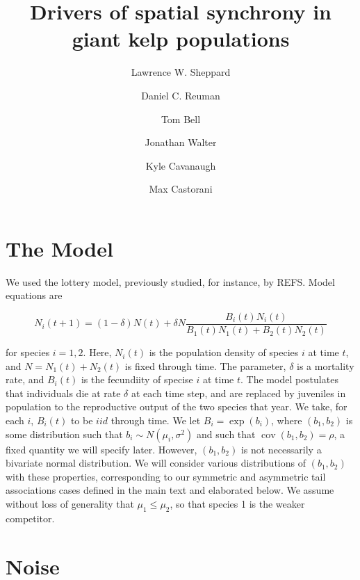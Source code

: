 \documentclass[letterpaper,11pt]{article}
\title{Drivers of spatial synchrony in giant kelp populations}
\date{}
\author{Lawrence W. Sheppard}
\author{Daniel C. Reuman}
\author{Tom Bell}
\author{Jonathan Walter}
\author{Kyle Cavanaugh}
\author{Max Castorani}
\DeclareMathOperator{\CovX}{cov}
\begin{document}



\maketitle


\section{The Model}

We used the lottery model, previously studied, for instance, by REFS. Model equations are

\begin{equation}
N_i(t+1)=(1-\delta)N(t)+\delta N \frac{B_i(t)N_i(t)}{B_1(t)N_1(t)+B_2(t)N_2(t)}  \label{model_eq}
\end{equation}

\noindent for species $i=1,2$. Here, $N_i(t)$ is the population density of species $i$ at time $t$, and $N = N_1(t)+N_2(t)$ is fixed through time. The parameter, $\delta$ is a mortality rate, and $B_i(t)$ is the fecundiity of specise $i$ at time $t$. The model postulates that individuals die at rate $\delta$ at each time step, and are replaced by juveniles in population to the reproductive output of the two species that year. We take, for each $i$, $B_i(t)$ to be $iid$ through time. We let $B_i = \exp(b_i)$, where $(b_1, b_2)$ is some distribution such that $b_i \sim N(\mu_i, \sigma^2)$ and such that $\CovX(b_1, b_2) = \rho$, a fixed quantity we will specify later. However, $(b_1, b_2)$ is not necessarily a bivariate normal distribution. We will consider various distributions of $(b_1, b_2)$ with these properties, corresponding to our symmetric and asymmetric tail associations cases defined in the main text and elaborated below. We assume without loss of generality that $\mu_1 \leq \mu_2$, so that species 1 is the weaker competitor. 

\section{Noise} \label{sect:noise}
\end{document}
